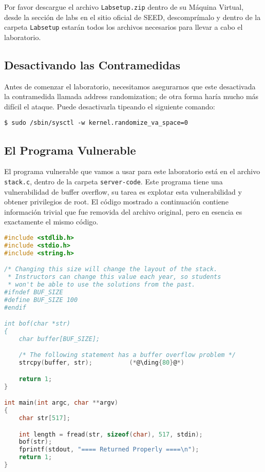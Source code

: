 Por favor descargue el archivo \texttt{Labsetup.zip} dentro de su Máquina Virtual, desde la sección de labs en el sitio oficial de SEED, descomprímalo y dentro de la carpeta \texttt{Labsetup} estarán todos los archivos necesarios para llevar a cabo el laboratorio.


\subsection{Desactivando las Contramedidas} 

Antes de comenzar el laboratorio, necesitamos asegurarnos que este desactivada la contramedida llamada address randomization; de otra forma haría mucho más difícil el ataque.
Puede desactivarla tipeando el siguiente comando:

\begin{lstlisting}
$ sudo /sbin/sysctl -w kernel.randomize_va_space=0
\end{lstlisting}
 

\subsection{El Programa Vulnerable} 
\label{sec:vulnerable_program}

El programa vulnerable que vamos a usar para este laboratorio está en el archivo \texttt{stack.c}, dentro de la carpeta \texttt{server-code}. Este programa tiene una vulnerabilidad de buffer overflow, su tarea es explotar esta vulnerabilidad y obtener privilegios de root. El código mostrado a continuación contiene información trivial que fue removida del archivo original, pero en esencia es exactamente el mismo código.

\begin{lstlisting}[language=C, caption={\texttt{stack.c}}]
#include <stdlib.h>
#include <stdio.h>
#include <string.h>

/* Changing this size will change the layout of the stack.
 * Instructors can change this value each year, so students
 * won't be able to use the solutions from the past.
#ifndef BUF_SIZE
#define BUF_SIZE 100
#endif

int bof(char *str)
{
    char buffer[BUF_SIZE];

    /* The following statement has a buffer overflow problem */ 
    strcpy(buffer, str);          (*@\ding{80}@*)

    return 1;
}

int main(int argc, char **argv)
{
    char str[517];

    int length = fread(str, sizeof(char), 517, stdin);
    bof(str);
    fprintf(stdout, "==== Returned Properly ====\n");
    return 1;
}
\end{lstlisting}

